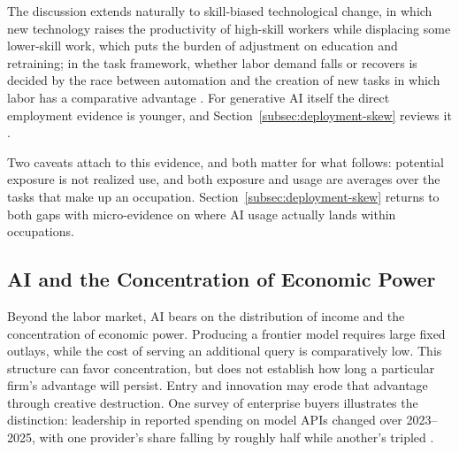 \documentclass[12pt]{article}
\theoremstyle{plain}
\theoremstyle{definition}
\theoremstyle{remark}
\begin{document}
The discussion extends naturally to skill-biased technological change,
in which new technology raises the productivity of high-skill workers
while displacing some lower-skill work, which puts the burden of
adjustment on education and retraining; in the task framework, whether
labor demand falls or recovers is decided by the race between automation and
the creation of new tasks in which labor has a comparative advantage
\citep{AcemogluRestrepo2018Race}. For generative AI itself the direct
employment evidence is younger, and
Section~\ref{subsec:deployment-skew} reviews it
\citep{HumlumVestergaard2025, BrynjolfssonChandarChen2025}.

Two caveats attach to this evidence, and both
matter for what follows: potential exposure is not realized use, and
both exposure and usage are averages over the tasks that make up an
occupation. Section~\ref{subsec:deployment-skew} returns to both gaps
with micro-evidence on where AI usage actually lands within occupations.

\subsection{AI and the Concentration of Economic Power}\label{subsec:power}

Beyond the labor market, AI bears on the distribution of income and
the concentration of economic power. Producing a frontier model requires
large fixed outlays, while the cost of serving an additional query is
comparatively low. This structure can favor concentration, but does not
establish how long a particular firm's advantage will persist. Entry
and innovation may erode that advantage through creative
destruction. One survey of enterprise
buyers illustrates the distinction: leadership in reported spending on
model APIs changed over 2023--2025, with one provider's share falling by
roughly half while another's tripled
\citep{MenloVentures2025Enterprise}.
\end{document}
